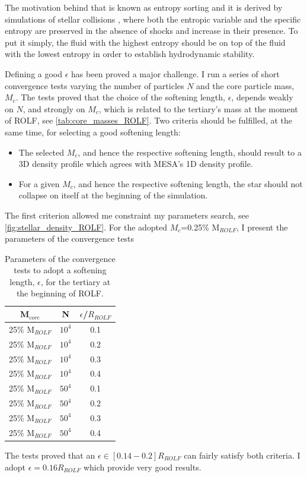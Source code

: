 The motivation behind that is known as entropy sorting and it is derived by simulations of stellar collisions \citep{lombardi1995collisions,lombardi2003modelling,lombardi2006stellar,gaburov2008mixing,gaburov2010onset}, where both the entropic variable and the specific entropy are preserved in the absence of shocks and increase in their presence. To put it simply, the fluid with the highest entropy should be on top of the fluid with the lowest entropy in order to establish hydrodynamic stability. 

Defining a good $\epsilon$ has been proved a major challenge. I run a series of short convergence tests varying the number of particles $N$ and the core particle mass, $M_c$. The tests proved that the choice of the softening length, $\epsilon$, depends weakly on $N$, and strongly on $M_c$, which is related to the tertiary's mass at the moment of ROLF, see \cref{tab:core_masses_ROLF}. Two criteria should be fulfilled, at the same time, for selecting a good softening length:
\begin{itemize}
    \item The selected $M_c$, and hence the respective softening length, should result to a 3D density profile which agrees with MESA's 1D density profile.
    \item For a given $M_c$, and hence the respective softening length, the star should not collapse on itself at the beginning of the simulation.
\end{itemize}
The first criterion allowed me constraint my parameters search, see \cref{fig:stellar_density_ROLF}. For the adopted $M_c$=0.25\% M$_{ROLF}$, I present the parameters of the convergence tests
\begin{table}[H]
    \centering
    \begin{tabular}{| c | c | c |}
       M$_{core}$  & N & $\epsilon$/$R_{ROLF}$ \\
       \hline
       25\% M$_{ROLF}$ & $10^4$ & 0.1\\
       25\% M$_{ROLF}$ & $10^4$ & 0.2\\
       25\% M$_{ROLF}$ & $10^4$ & 0.3\\
       25\% M$_{ROLF}$ & $10^4$ & 0.4\\
       \hline
       25\% M$_{ROLF}$ & $50^4$ & 0.1\\
       25\% M$_{ROLF}$ & $50^4$ & 0.2\\
       25\% M$_{ROLF}$ & $50^4$ & 0.3\\
       25\% M$_{ROLF}$ & $50^4$ & 0.4\\
    \end{tabular}
    \caption{ Parameters of the convergence tests to adopt a softening length, $\epsilon$, for the tertiary at the beginning of ROLF.}
\label{tab:smoothing_length_exploration}
\end{table}
The tests proved that an $\epsilon \in [0.14-0.2] R_{ROLF}$ can fairly satisfy both criteria. I adopt $\epsilon = 0.16 R_{ROLF}$ which provide very good results.

